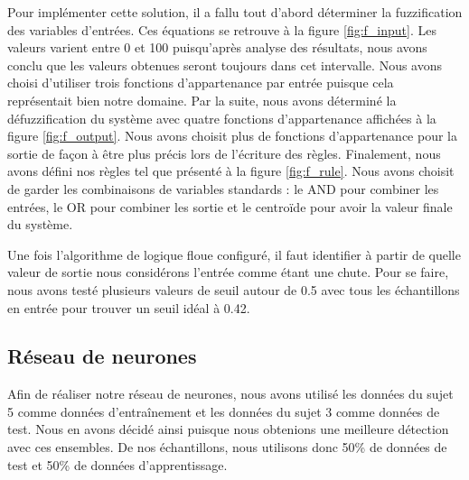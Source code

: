 \documentclass[12pt,letterpaper]{article}
\begin{document}
Pour implémenter cette solution, il a fallu tout d'abord déterminer la fuzzification des variables d'entrées. Ces équations
se retrouve à la figure \ref{fig:f_input}. Les valeurs varient entre 0 et 100 puisqu'après analyse des résultats, nous avons conclu que les valeurs obtenues seront toujours dans cet intervalle. Nous avons choisi d'utiliser trois fonctions d'appartenance par entrée puisque cela représentait bien notre domaine. Par la suite, nous avons déterminé la défuzzification du système avec quatre fonctions d'appartenance affichées à la figure \ref{fig:f_output}. Nous avons choisit plus de fonctions d'appartenance pour la sortie de façon à être plus précis lors de l'écriture des règles. Finalement, nous avons défini nos règles tel que présenté à la figure \ref{fig:f_rule}. Nous avons choisit de garder les combinaisons de variables standards : le AND pour combiner les entrées, le OR pour combiner les sortie et le centroïde pour avoir la valeur finale du système.

Une fois l'algorithme de logique floue configuré, il faut identifier à partir de quelle valeur de sortie nous considérons l'entrée comme étant une chute. Pour se faire, nous avons testé plusieurs valeurs de seuil autour de 0.5 avec tous les échantillons en entrée pour trouver un seuil idéal à 0.42.

\subsection{Réseau de neurones} %

Afin de réaliser notre réseau de neurones, nous avons utilisé les données du sujet 5 comme données d'entraînement et les données du sujet 3 comme données de test. Nous en avons décidé ainsi puisque nous obtenions une meilleure détection avec ces ensembles. De nos échantillons, nous utilisons donc 50\%  de données de test et 50\% de données d'apprentissage.
\end{document}
